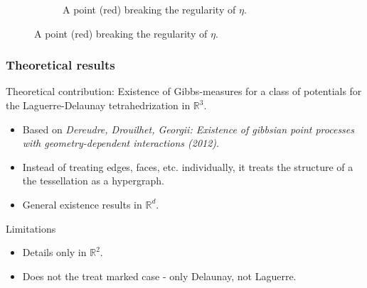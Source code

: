 \documentclass[c, 10pt]{beamer}
\begin{document}
\begin{frame}
\begin{figure}
\begin{minipage}{0.45\textwidth}
\begin{figure}[p]
{
}
\caption{\scriptsize A point (red) breaking the regularity of $\eta$.}
\label{fig:Laguerrecospherical}
\end{figure}
    \end{minipage}
\end{figure}

\vspace{-4mm}






\end{frame}





\begin{frame}\frametitle{Theoretical results}
	\alert{Theoretical contribution:} Existence of Gibbs-measures for a class of potentials for the Laguerre-Delaunay tetrahedrization in $\mathbb R^3$.

	\vspace{5mm}

	\begin{itemize}
		\item Based on \textit{Dereudre, Drouilhet, Georgii: Existence of gibbsian point processes with geometry-dependent interactions (2012)}.
		\item Instead of treating edges, faces, etc. individually, it treats the structure of a the tessellation as a \alert{hypergraph}.
		\item General existence results in $\mathbb R^d$. 
	\end{itemize}

	\vspace{5mm}

	Limitations
	\begin{itemize}
		\item Details only in $\mathbb R^2$.
		\item Does not the treat marked case - only Delaunay, not Laguerre.
	\end{itemize}
\end{frame}
\end{document}
